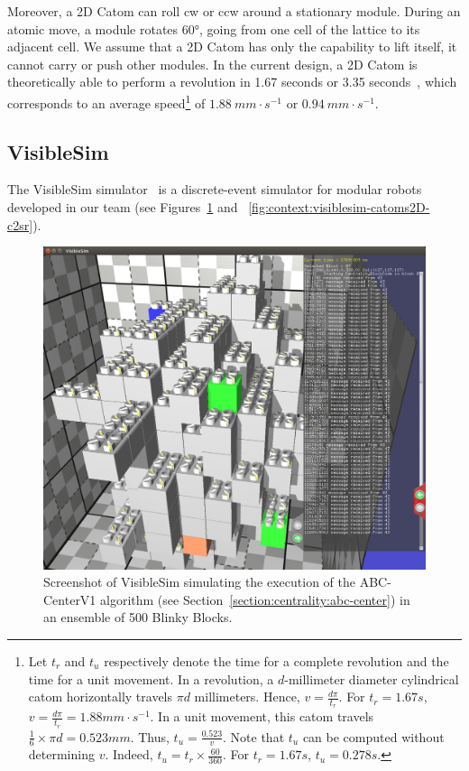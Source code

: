 Moreover, a 2D Catom can roll \acrfull{cw} or \acrfull{ccw} around a stationary module. During an atomic move, a module rotates $60°$, going from one cell of the lattice to its adjacent cell. We assume that a 2D Catom has only the capability to lift itself, it cannot carry or push other modules. In the current design, a 2D Catom is theoretically able to perform a revolution in 1.67 seconds or 3.35 seconds~\cite{karagozler-phdthesis}, which corresponds to an average speed\footnote{Let $t_r$ and $t_u$ respectively denote the time for a complete revolution and the time for a unit movement. In a revolution, a $d$-millimeter diameter cylindrical catom horizontally travels $\pi d$ millimeters. Hence, $v = \frac{d\pi}{t_r}$. For $t_r = 1.67s$, $v = \frac{d\pi}{t_r} = 1.88 mm \cdot s^{-1}$. In a unit movement, this catom travels $\frac{1}{6} \times \pi d = 0.523 mm$. Thus, $t_u = \frac{0.523}{v}$. Note that $t_u$ can be computed without determining $v$. Indeed, $t_u = t_r \times \frac{60}{360}$. For $t_r = 1.67 s$, $t_u = 0.278s$.} of $1.88~mm \cdot s^{-1}$ or $0.94~mm \cdot s^{-1}$.


\subsection{VisibleSim}
\label{section:context:visiblesim}

The VisibleSim simulator~\cite{dhoutaut2013efficient} is a discrete-event simulator for modular robots developed in our team (see Figures~\ref{fig:context:visiblesim-blinkyblocks-abccenter} and ~\ref{fig:context:visiblesim-catoms2D-c2sr}).

\begin{figure}[!h]
	\centering
	\includegraphics[width=0.85\linewidth]{images/context/visiblesim-abc-center.png}
	\caption{Screenshot of VisibleSim simulating the execution of the ABC-CenterV1 algorithm (see Section~\ref{section:centrality:abc-center}) in an ensemble of 500 Blinky Blocks.}
	\label{fig:context:visiblesim-blinkyblocks-abccenter}
\end{figure}

